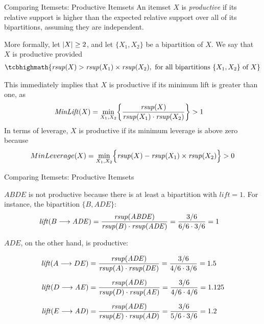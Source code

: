\begin{frame}{Comparing Itemsets: Productive Itemsets}
An itemset $X$ is {\em productive}
if its
relative support is higher than the expected
relative support over all of its bipartitions,
assuming they are independent.

More formally, let $|X| \ge 2$, and let
$\{X_1,X_2\}$ be a bipartition of $X$.
We say that $X$ is productive provided
\begin{align*}
\tcbhighmath{
\rsupp(X) > \rsupp(X_1) \times \rsupp(X_2),
\text{ for all bipartitions } \{X_1, X_2\} \text{ of } X
}
\end{align*}

\bigskip
This immediately implies that
$X$ is productive if its minimum lift is greater than one, as
\begin{align*}
  \mathit{MinLift}(X) & =
  \min_{X_1,X_2} \biggl\{ \frac{\mathit{rsup}(X)}{\mathit{rsup}(X_1) \cdot
  \mathit{rsup}(X_2)} \biggr\}
  > 1
\end{align*}
In terms of leverage, $X$ is productive if its minimum leverage is above
zero because
\begin{align*}
MinLeverage(X) =
\min_{X_1,X_2} \Bigl\{
\mathit{rsup}(X) - \mathit{rsup}(X_1) \times \mathit{rsup}(X_2)
\Bigr\} > 0
\end{align*}
\end{frame}

\begin{frame}{Comparing Itemsets: Productive Itemsets}

	$ABDE$ is not productive because there is at least a bipartition with $lift=1$. For instance, the bipartition $\{B,ADE\}$:
\begin{align*}
\lift(B \arule \mathit{ADE}) & =
    \frac{\rsupp(\mathit{ABDE})}{\rsupp(B) \cdot \rsupp(\mathit{ADE})}
    = \frac{3/6}{6/6 \cdot 3/6} = 1
\end{align*}

$ADE$, on the other hand, is productive:

\begin{align*}
\lift(A \arule DE) & =
    \frac{\rsupp(\mathit{ADE})}{\rsupp(A) \cdot \rsupp(\mathit{DE})}
    = \frac{3/6}{4/6 \cdot 3/6} = 1.5\\[6pt]
    \lift(D \arule \mathit{AE}) & =
    \frac{\rsupp(\mathit{ADE})}{\rsupp(D) \cdot \rsupp(\mathit{AE})}
    = \frac{3/6}{4/6 \cdot 4/6} = 1.125\\[6pt]
    \lift(E \arule \mathit{AD}) & =
    \frac{\rsupp(\mathit{ADE})}{\rsupp(E) \cdot \rsupp(\mathit{AD})}
    = \frac{3/6}{5/6 \cdot 3/6} = 1.2
\end{align*}

\end{frame}


